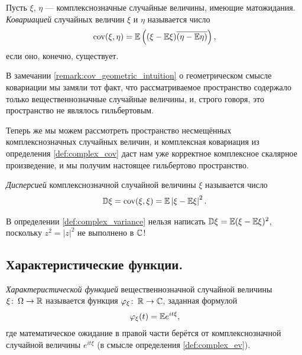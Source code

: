 \documentclass[../main.tex]{subfiles}
\begin{document}
\begin{df}
 \label{def:complex_cov}
 Пусть $ \xi $, $ \eta $ --- комплекснозначные случайные величины, имеющие матожидания. \textit{Ковариацией} случайных величин $ \xi $ и $ \eta $ называется число
 \begin{align*}
  \mathrm{cov}(\xi,\eta) = \mathbb E\left((\xi-\mathbb E\xi) \overline{(\eta - \mathbb E\eta)}\right),
 \end{align*} если оно, конечно, существует.
\end{df}

\begin{remrk*}
 В замечании \ref{remark:cov_geometric_intuition} о геометрическом смысле ковариации мы замяли тот факт, что рассматриваемое пространство содержало только вещественнозначные случайные величины, и, строго говоря, это пространство не являлось гильбертовым.

 Теперь же мы можем рассмотреть пространство несмещённых комплекснозначных случайных величин, и комплексная ковариация из определения \ref{def:complex_cov} даст нам уже корректное комплексное скалярное произведение, и мы получим настоящее гильбертово пространство.
\end{remrk*}

\begin{df}[дисперсия]
 \label{def:complex_variance}
 \textit{Дисперсией} комплекснозначной случайной величины $ \xi $  называется число
 \begin{align*}
  \mathbb D\xi = \mathrm{cov}(\xi,\xi) = \mathbb E \left| \xi-\mathbb E\xi \right|^{2}.
 \end{align*}
\end{df}

\begin{remrk*}
 В определении \ref{def:complex_variance} нельзя написать $ \mathbb D\xi = \mathbb E (\xi-\mathbb E\xi)^{2} $, поскольку $ z^{2} = \left| z \right|^{2} $ не выполнено в $ \mathbb{C} $!
\end{remrk*}

\subsection{Характеристические функции.}

\begin{df}
 \textit{Характеристической функцией} вещественнозначной случайной величины $ \xi \colon\, \Omega \to \mathbb{R} $ называется функция $ \varphi_\xi \colon\, \mathbb{R} \to \mathbb{C} $, заданная формулой
 \begin{align*}
  \varphi_\xi(t) = \mathbb E  e^{it\xi} ,
 \end{align*} где математическое ожидание в правой части берётся от комплекснозначной случайной величины $ e^{it\xi} $ (в смысле определения \ref{def:complex_ev}).
\end{df}
\end{document}
